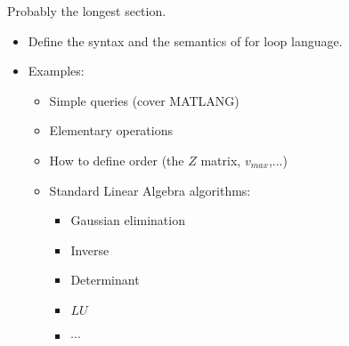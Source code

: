 Probably the longest section.

\begin{itemize}
\item Define the syntax and the semantics of for loop language. 
\item Examples:
\begin{itemize}
\item Simple queries (cover MATLANG)
\item Elementary operations
\item How to define order (the $Z$ matrix, $v_{max}$,...)
\item Standard Linear Algebra algorithms:
\begin{itemize}
\item Gaussian elimination
\item Inverse
\item Determinant
\item $LU$
\item $\cdots$
\end{itemize}
\end{itemize}
\end{itemize}
